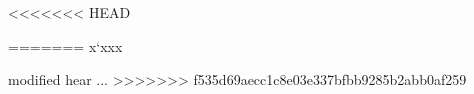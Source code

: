 \documentclass[12pt,a4paper]{article}
\begin{document}

<<<<<<< HEAD
\tableofcontents \newpage


=======
x`xxx

modified hear ...
>>>>>>> f535d69aecc1c8e03e337bfbb9285b2abb0af259


\newpage


\end{document}
